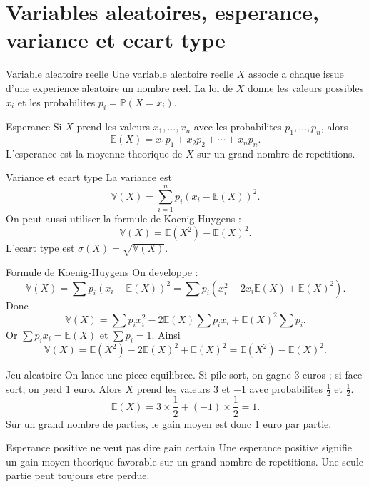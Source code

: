 \documentclass[11pt,a4paper]{article}
\newcommand{\E}{\mathbb{E}}
\newcommand{\V}{\mathbb{V}}
\newcommand{\Pp}{\mathbb{P}}
\begin{document}
\section{Variables aleatoires, esperance, variance et ecart type}

\begin{boitecours}{Variable aleatoire reelle}
Une variable aleatoire reelle $X$ associe a chaque issue d'une experience aleatoire un nombre reel. La loi de $X$ donne les valeurs possibles $x_i$ et les probabilites $p_i=\Pp(X=x_i)$.
\end{boitecours}

\begin{boitecours}{Esperance}
Si $X$ prend les valeurs $x_1,\dots,x_n$ avec les probabilites $p_1,\dots,p_n$, alors
\[
\E(X)=x_1p_1+x_2p_2+\cdots+x_np_n.
\]
L'esperance est la moyenne theorique de $X$ sur un grand nombre de repetitions.
\end{boitecours}

\begin{boitecours}{Variance et ecart type}
La variance est
\[
\V(X)=\sum_{i=1}^n p_i(x_i-\E(X))^2.
\]
On peut aussi utiliser la formule de Koenig-Huygens :
\[
\V(X)=\E(X^2)-\E(X)^2.
\]
L'ecart type est $\sigma(X)=\sqrt{\V(X)}$.
\end{boitecours}

\begin{boitepreuve}{Formule de Koenig-Huygens}
On developpe :
\[
\V(X)=\sum p_i(x_i-\E(X))^2=\sum p_i(x_i^2-2x_i\E(X)+\E(X)^2).
\]
Donc
\[
\V(X)=\sum p_ix_i^2-2\E(X)\sum p_ix_i+\E(X)^2\sum p_i.
\]
Or $\sum p_ix_i=\E(X)$ et $\sum p_i=1$. Ainsi
\[
\V(X)=\E(X^2)-2\E(X)^2+\E(X)^2=\E(X^2)-\E(X)^2.
\]
\end{boitepreuve}

\begin{boiteexemple}{Jeu aleatoire}
On lance une piece equilibree. Si pile sort, on gagne $3$ euros ; si face sort, on perd $1$ euro. Alors $X$ prend les valeurs $3$ et $-1$ avec probabilites $\frac12$ et $\frac12$.
\[
\E(X)=3\times\frac12+(-1)\times\frac12=1.
\]
Sur un grand nombre de parties, le gain moyen est donc $1$ euro par partie.
\end{boiteexemple}

\begin{boiteattention}{Esperance positive ne veut pas dire gain certain}
Une esperance positive signifie un gain moyen theorique favorable sur un grand nombre de repetitions. Une seule partie peut toujours etre perdue.
\end{boiteattention}
\end{document}
